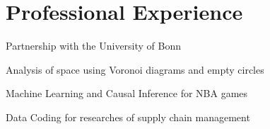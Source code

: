

\section{Professional Experience}



\begin{tightemize}
    \item Partnership with the University of Bonn
\end{tightemize}
\sectionsep

\begin{tightemize}
    \item Analysis of space using Voronoi diagrams and empty circles
\end{tightemize}
\sectionsep

  
\begin{tightemize}
\item Machine Learning and Causal Inference for NBA games
\item Data Coding for researches of supply chain management
    \end{tightemize}
\sectionsep


